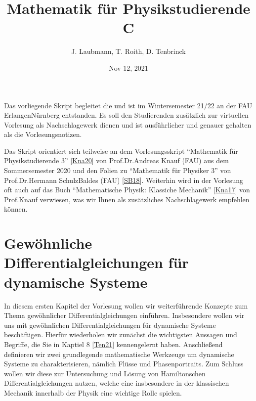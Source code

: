 \documentclass[letterpaper,10pt,english]{jupyterBook}
\title{Mathematik für Physikstudierende C}
\date{Nov 12, 2021}
\author{J.\@{} Laubmann, T.\@{} Roith, D.\@{} Tenbrinck}
\begin{document}
\pagestyle{empty}
\sphinxmaketitle
\pagestyle{plain}
\sphinxtableofcontents
\pagestyle{normal}
\label{\detokenize{intro::doc}}


\noindent{}

\sphinxAtStartPar
Das vorliegende Skript begleitet die  und ist im Wintersemester 21/22 an der FAU Erlangen\sphinxhyphen{}Nürnberg entstanden. Es soll den Studierenden zusätzlich zur virtuellen Vorlesung als Nachschlagewerk dienen und ist ausführlicher und genauer gehalten als die Vorlesungsnotizen.

\begin{DUlineblock}{0em}
\item[] 
\end{DUlineblock}

\sphinxAtStartPar
Das Skript orientiert sich teilweise an dem Vorlesungsskript “Mathematik für Physikstudierende 3” {[}\hyperlink{cite.references:id7}{Kna20}{]} von Prof.Dr.Andreas Knauf (FAU) aus dem Sommersemester 2020 und den Folien zu “Mathematik für Physiker 3” von Prof.Dr.Hermann Schulz\sphinxhyphen{}Baldes (FAU) {[}\hyperlink{cite.references:id10}{SB18}{]}. Weiterhin wird in der Vorlesung oft auch auf das Buch “Mathematische Physik: Klassiche Mechanik” {[}\hyperlink{cite.references:id8}{Kna17}{]} von Prof.Knauf verwiesen, was wir Ihnen als zusätzliches Nachschlagewerk empfehlen können.


\chapter{Gewöhnliche Differentialgleichungen für dynamische Systeme}
\label{\detokenize{ode/ode:gewohnliche-differentialgleichungen-fur-dynamische-systeme}}\label{\detokenize{ode/ode::doc}}
\sphinxAtStartPar
In diesem ersten Kapitel der Vorlesung wollen wir weiterführende Konzepte zum Thema gewöhnlicher Differentialgleichungen einführen.
Insbesondere wollen wir uns mit gewöhnlichen Differentialgleichungen für dynamische Systeme beschäftigen.
Hierfür wiederholen wir zunächst die wichtigsten Aussagen und Begriffe, die Sie in Kaptiel 8 {[}\hyperlink{cite.references:id12}{Ten21}{]} kennengelernt haben.
Anschließend definieren wir zwei grundlegende mathematische Werkzeuge um dynamische Systeme zu charakterisieren, nämlich Flüsse und Phasenportraits.
Zum Schluss wollen wir diese zur Untersuchung und Lösung von Hamiltonschen Differentialgleichungen nutzen, welche eine insbesondere in der klassischen Mechanik innerhalb der Physik eine wichtige Rolle spielen.
\end{document}
